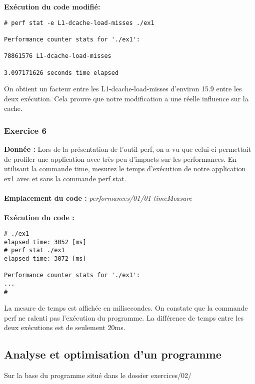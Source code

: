 \textbf{Exécution du code modifié: } \\
\begin{lstlisting}
# perf stat -e L1-dcache-load-misses ./ex1 

Performance counter stats for './ex1':

78861576 L1-dcache-load-misses                                       

3.097171626 seconds time elapsed

\end{lstlisting}

On obtient un facteur entre les L1-dcache-load-misses d'environ 15.9 entre les deux exécution. Cela prouve que notre modification a une réelle influence sur la cache.

\subsubsection{Exercice 6}
\textbf{Donnée : } Lors	de	la	présentation	de	l'outil	perf,	on	a	vu	que	celui-ci	permettait	de	profiler	une	application	avec	
très	peu	d'impacts	sur	les	performances.	En	utilisant	la	commande	time,	mesurez	le	temps	d'exécution	
de	notre	application	ex1	avec	et	sans	la	commande	perf	stat.\\\\
\textbf{Emplacement du code : }\textit{performances/01/01-timeMeasure}\\\\
\textbf{Exécution du code : } \\
\begin{lstlisting}
# ./ex1                                                                         
elapsed time: 3052 [ms]                                                         
# perf stat ./ex1                                                               
elapsed time: 3072 [ms]                                                         

Performance counter stats for './ex1':                                         
...                                       
# 
\end{lstlisting}

La mesure de temps est affichée en milisecondes. On constate que la commande perf ne ralenti pas l'exécution du programme. La différence de temps entre les deux exécutions est de seulement 20ms.

\subsection{Analyse et optimisation d'un programme}
Sur	la	base	du	programme	situé	dans	le	dossier	exercices/02/
